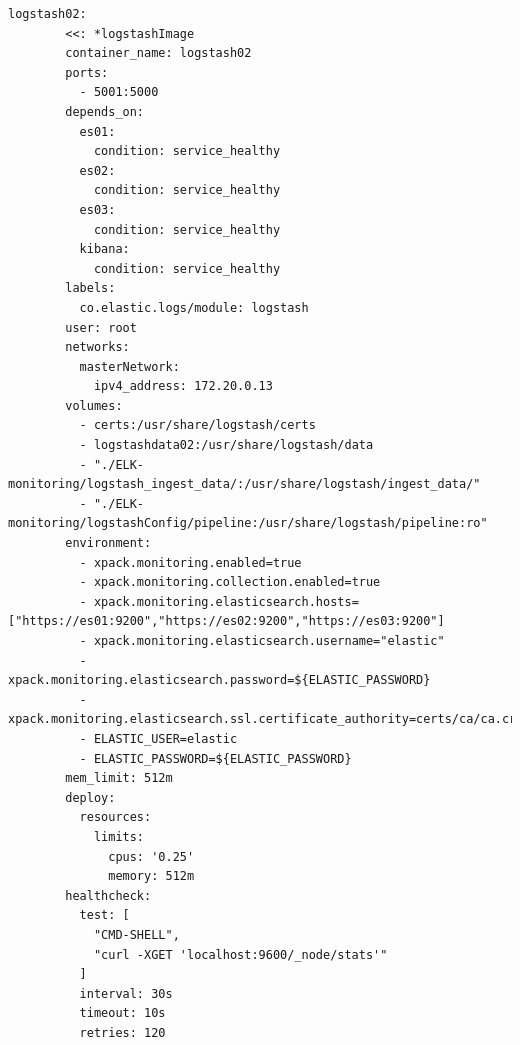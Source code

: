 \begin{lstlisting}[caption=Plik docker-comose.yml, label=dockerComposeFile]
      logstash02:
        <<: *logstashImage
        container_name: logstash02
        ports:
          - 5001:5000
        depends_on:
          es01:
            condition: service_healthy
          es02:
            condition: service_healthy
          es03:
            condition: service_healthy
          kibana:
            condition: service_healthy
        labels:
          co.elastic.logs/module: logstash
        user: root
        networks:
          masterNetwork:
            ipv4_address: 172.20.0.13
        volumes:
          - certs:/usr/share/logstash/certs
          - logstashdata02:/usr/share/logstash/data
          - "./ELK-monitoring/logstash_ingest_data/:/usr/share/logstash/ingest_data/"
          - "./ELK-monitoring/logstashConfig/pipeline:/usr/share/logstash/pipeline:ro"
        environment:
          - xpack.monitoring.enabled=true
          - xpack.monitoring.collection.enabled=true
          - xpack.monitoring.elasticsearch.hosts=["https://es01:9200","https://es02:9200","https://es03:9200"]
          - xpack.monitoring.elasticsearch.username="elastic"
          - xpack.monitoring.elasticsearch.password=${ELASTIC_PASSWORD}
          - xpack.monitoring.elasticsearch.ssl.certificate_authority=certs/ca/ca.crt
          - ELASTIC_USER=elastic
          - ELASTIC_PASSWORD=${ELASTIC_PASSWORD}
        mem_limit: 512m
        deploy:
          resources:
            limits:
              cpus: '0.25'
              memory: 512m
        healthcheck:
          test: [
            "CMD-SHELL",
            "curl -XGET 'localhost:9600/_node/stats'"
          ]
          interval: 30s
          timeout: 10s
          retries: 120
    

\end{lstlisting}
